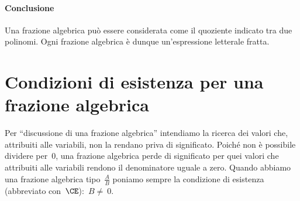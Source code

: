 \paragraph{Conclusione}Una frazione algebrica può essere considerata come il 
quoziente indicato tra due polinomi.
Ogni frazione algebrica è dunque un'espressione letterale fratta.

\section{Condizioni di esistenza per una frazione algebrica}
\label{sec:frazalg_condizioniesistenza}

Per ``discussione di una frazione algebrica'' intendiamo la ricerca dei valori 
che, attribuiti alle variabili, non la rendano priva di significato. 
Poiché non è possibile dividere per~$0$, una frazione algebrica perde di 
significato per quei valori che attribuiti alle variabili rendono il 
denominatore uguale a zero. 
Quando abbiamo una frazione algebrica tipo~$\frac{A}{B}$ poniamo sempre la 
condizione di esistenza (abbreviato con~$\CE$):~$B\neq~0$.

